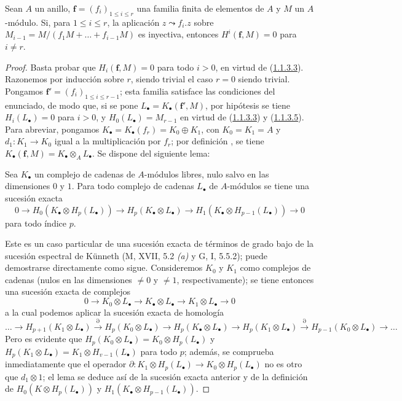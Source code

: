 \begin{proposition}[1.1.4]
\label{III.1.1.4}
\label{III.1.1.4-fr}
Sean $A$ un anillo, $\mathbf f=(f_i)_{1\leq i\leq r}$ una familia finita de elementos de $A$ y $M$ un $A$-módulo.
Si, para $1\leq i\leq r$, la aplicación $z\leadsto f_i.z$ sobre $M_{i-1}=M/(f_1M+\ldots+f_{i-1}M)$ es inyectiva, entonces $H^i(\mathbf f,M)=0$ para $i\neq r$.
\end{proposition}

\begin{proof}
Basta probar que $H_i(\mathbf f,M)=0$ para todo $i>0$, en virtud de (\hyperref[III.1.1.3.3]{1.1.3.3}).
Razonemos por inducción sobre $r$, siendo trivial el caso $r=0$ siendo trivial. Pongamos $\mathbf f'=(f_i)_{1\leq i\leq r-1}$; esta familia satisface las condiciones del enunciado, de modo que, si se pone $L_\bullet=K_\bullet(\mathbf f',M)$, por hipótesis se tiene $H_i(L_\bullet)=0$ para $i>0$, y $H_0(L_\bullet)=M_{r-1}$ en virtud de (\hyperref[III.1.1.3.3]{1.1.3.3}) y (\hyperref[III.1.1.3.5]{1.1.3.5}).
Para abreviar, pongamos $K_\bullet=K_\bullet(f_r)=K_0\oplus K_1$, con $K_0=K_1=A$ y $d_1:K_1\to K_0$ igual a la multiplicación por $f_r$; por definición , se tiene $K_\bullet(\mathbf f,M)=K_\bullet\otimes_A L_\bullet$.
Se dispone del siguiente lema:

\begin{lemma}[1.1.4.1]
\label{III.1.1.4.1}
\label{III.1.1.4.1-fr}
Sea $K_\bullet$ un complejo de cadenas de $A$-módulos libres, nulo salvo en las dimensiones $0$ y $1$.
Para todo complejo de cadenas $L_\bullet$ de $A$-módulos se tiene una sucesión exacta
\[
0\longrightarrow H_0(K_\bullet\otimes H_p(L_\bullet))
\longrightarrow H_p(K_\bullet\otimes L_\bullet)
\longrightarrow H_1(K_\bullet\otimes H_{p-1}(L_\bullet))
\longrightarrow0
\]
para todo índice $p$.
\end{lemma}

Este es un caso particular de una sucesión exacta de términos de grado bajo de la sucesión espectral de K\"unneth (M, XVII, 5.2 \emph{(a)} y G, I, 5.5.2); puede demostrarse directamente como sigue.
Consideremos $K_0$ y $K_1$ como complejos de cadenas (nulos en las dimensiones $\neq0$ y $\neq1$, respectivamente); se tiene entonces una sucesión exacta de complejos
\[
0\longrightarrow K_0\otimes L_\bullet
\longrightarrow K_\bullet\otimes L_\bullet
\longrightarrow K_1\otimes L_\bullet\longrightarrow0
\] a la cual podemos aplicar la sucesión exacta de homología \[
\ldots\longrightarrow H_{p+1}(K_1\otimes L_\bullet)
\xrightarrow{\partial}H_p(K_0\otimes L_\bullet)
\longrightarrow H_p(K_\bullet\otimes L_\bullet)
\longrightarrow H_p(K_1\otimes L_\bullet)
\xrightarrow{\partial}H_{p-1}(K_0\otimes L_\bullet)
\longrightarrow\ldots
\]
Pero es evidente que $H_p(K_0\otimes L_\bullet)=K_0\otimes H_p(L_\bullet)$ y $H_p(K_1\otimes L_\bullet)=K_1\otimes H_{v-1}(L_\bullet)$ para todo $p$; además, se comprueba inmediatamente que el operador $\partial:K_1\otimes H_p(L_\bullet)\to K_0\otimes H_p(L_\bullet)$ no es otro que $d_1\otimes1$; el lema se deduce así de la sucesión exacta anterior y de la definición de $H_0(K\otimes H_p(L_\bullet))$ y $H_1(K_\bullet\otimes H_{p-1}(L_\bullet))$.


\end{proof}

